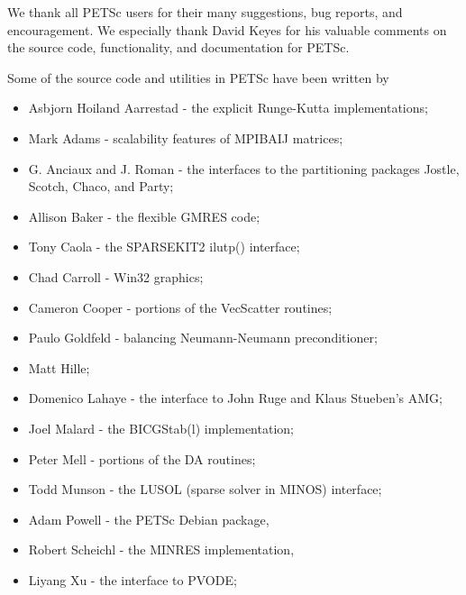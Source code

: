 %
%

\medskip \medskip \noindent
We thank all PETSc users for their many suggestions, bug reports, and
encouragement.  We especially thank David Keyes
for his valuable comments on the source code,
functionality, and documentation for PETSc.


\vspace{.3in}
\noindent
Some of the source code and utilities in PETSc
have been written by 
\begin{itemize}
  \item Asbjorn Hoiland Aarrestad - the explicit Runge-Kutta implementations;
  \item Mark Adams - scalability features of MPIBAIJ matrices;
  \item G. Anciaux and J. Roman - the interfaces to the partitioning packages Jostle, Scotch, Chaco, and Party;
  \item Allison Baker - the flexible GMRES code;
  \item Tony Caola - the SPARSEKIT2 ilutp() interface;
  \item Chad Carroll - Win32 graphics;
  \item Cameron Cooper - portions of the VecScatter routines;
  \item Paulo Goldfeld - balancing Neumann-Neumann preconditioner;
  \item Matt Hille;
  \item Domenico Lahaye - the interface to John Ruge and Klaus Stueben's AMG;
  \item Joel Malard - the BICGStab(l) implementation;
  \item Peter Mell - portions of the DA routines;
  \item Todd Munson - the LUSOL (sparse solver in MINOS) interface;
  \item Adam Powell - the PETSc Debian package, 
  \item Robert Scheichl - the MINRES implementation,
  \item Liyang Xu - the interface to PVODE;
\end{itemize}

